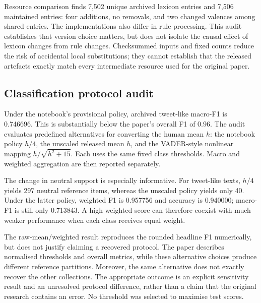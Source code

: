 \documentclass[11pt]{article}
\begin{document}
Resource comparison finds 7,502 unique archived lexicon entries and 7,506
maintained entries: four additions, no removals, and two changed valences among
shared entries. The implementations also differ in rule processing. This audit
establishes that version choice matters, but does not isolate the causal effect
of lexicon changes from rule changes. Checksummed inputs and fixed counts reduce
the risk of accidental local substitutions; they cannot establish that the released
artefacts exactly match every intermediate resource used for the original paper.

\subsection{Classification protocol audit}
Under the notebook's provisional policy, archived tweet-like macro-F1 is 0.746696.
This is substantially below the paper's overall F1 of 0.96. The audit evaluates
predefined alternatives for converting the human mean $h$: the notebook policy
$h/4$, the unscaled released mean $h$, and the VADER-style nonlinear mapping
$h/\sqrt{h^2+15}$. Each uses the same fixed class thresholds. Macro and weighted
aggregation are then reported separately.

\begin{table}[t]
\centering\small

\caption{Archived classification sensitivity. Columns vary reference-score scale
and F1 averaging, not the VADER threshold. The raw-mean/weighted tweet-like value
rounds to 0.96, but this numerical resemblance does not establish the original
evaluation protocol.}
\label{tab:policy}
\end{table}

The change in neutral support is especially informative. For tweet-like texts,
$h/4$ yields 297 neutral reference items, whereas the unscaled policy yields only
40. Under the latter policy, weighted F1 is 0.957756 and accuracy is 0.940000;
macro-F1 is still only 0.713843. A high weighted score can therefore coexist with
much weaker performance when each class receives equal weight.

The raw-mean/weighted result reproduces the rounded headline F1 numerically, but
does not justify claiming a recovered protocol. The paper describes normalised
thresholds and overall metrics, while these alternative choices produce different
reference partitions. Moreover, the same alternative does not exactly recover
the other collections. The appropriate outcome is an explicit sensitivity result
and an unresolved protocol difference, rather than a claim that the original
research contains an error. No threshold was selected to maximise test scores.
\end{document}
